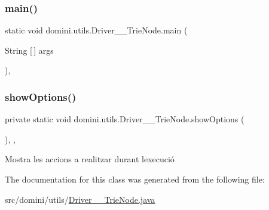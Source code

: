 \subsubsection{\texorpdfstring{main()}{main()}}
{\footnotesize\ttfamily static void domini.\+utils.\+Driver\+\_\+\+\_\+\+Trie\+Node.\+main (\begin{DoxyParamCaption}\item[{String \mbox{[}$\,$\mbox{]}}]{args }\end{DoxyParamCaption})\hspace{0.3cm}{\ttfamily [inline]}, {\ttfamily [static]}}

\mbox{\label{classdomini_1_1utils_1_1Driver____TrieNode_ab9e971ebb4f8e219efaab32c6654243a}} 
\subsubsection{\texorpdfstring{show\+Options()}{showOptions()}}
{\footnotesize\ttfamily private static void domini.\+utils.\+Driver\+\_\+\+\_\+\+Trie\+Node.\+show\+Options (\begin{DoxyParamCaption}{ }\end{DoxyParamCaption})\hspace{0.3cm}{\ttfamily [inline]}, {\ttfamily [static]}, {\ttfamily [private]}}



Mostra les accions a realitzar durant l\textquotesingle{}execució 



The documentation for this class was generated from the following file\+:\begin{DoxyCompactItemize}
\item 
src/domini/utils/\hyperlink{Driver____TrieNode_8java}{Driver\+\_\+\+\_\+\+Trie\+Node.\+java}\end{DoxyCompactItemize}
